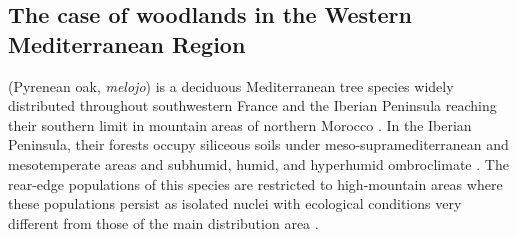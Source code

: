 \subsection{The case of \Qpy woodlands in the Western Mediterranean Region}\label{sec:es:intro-qp}
\Qpw (Pyrenean oak, \emph{melojo}) is a deciduous Mediterranean tree species widely distributed throughout southwestern France and the Iberian Peninsula reaching their southern limit in mountain areas of northern Morocco \autocites{Franco1990Quercus}. In the Iberian Peninsula, their forests occupy siliceous soils under meso-supramediterranean and mesotemperate areas and subhumid, humid, and hyperhumid ombroclimate \autocites{delaSernaetal2016MarcescentQuercus,Gavilanetal2018SclerophyllousDeciduous}. The rear-edge populations of this species are restricted to high-mountain areas where these populations persist as isolated nuclei with ecological conditions very different from those of the main distribution area \autocites{PerezLuqueetal2021EcologicalDiversity}.

